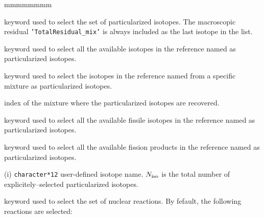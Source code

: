 \begin{ListeDeDescription}{mmmmmmmm}
\item[\moc{ISOT}] keyword used to select the set of particularized isotopes. The macroscopic
residual {\tt 'TotalResidual\_mix'} is always included as the last isotope in the list.

\item[\moc{TOUT}] keyword used to select all the available isotopes in the reference
 named  as particularized isotopes.

\item[\moc{MILI}] keyword used to select the isotopes in the reference
 named  from a specific mixture as particularized isotopes.

\item[\dusa{imil}] index of the mixture where the particularized isotopes are recovered.

\item[\moc{FISS}] keyword used to select all the available fissile isotopes in the reference
 named  as particularized isotopes.

\item[\moc{PF}] keyword used to select all the available fission products in the reference
 named  as particularized isotopes.

\item[\dusa{HNAISO}(i)] {\tt character*12} user-defined isotope name. $N_{\rm iso}$ is the
total number of explicitely--selected particularized isotopes.

\item[\moc{REAC}] keyword used to select the set of nuclear reactions. By fefault, the following reactions are selected:


\end{ListeDeDescription}
